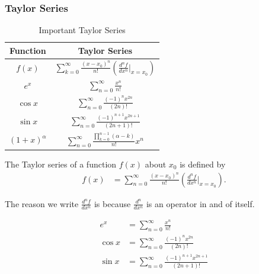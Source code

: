 \documentclass[10pt]{mypackage}
\begin{document}
\subsubsection{Taylor Series}%
\begin{table}
  \centering
  \renewcommand{\arraystretch}{2}
  \begin{tabular}{c|c}
    Function & Taylor Series\\
    \hline\hline
    $f(x)$ & $ \sum_{k=0}^{\infty}\frac{\left(x-x_0\right)^n}{n!}\left(\frac{d^{n}f}{dx^n}\biggr\vert_{x=x_0}\right)$\\
    $e^x$ & $\sum_{n=0}^{\infty}\frac{x^n}{n!}$\\
    $\cos x$ & $\sum_{n=0}^{\infty}\frac{\left(-1\right)^nx^{2n}}{\left(2n\right)!}$\\
    $\sin x$ & $\sum_{n=0}^{\infty}\frac{\left(-1\right)^{n+1}x^{2n+1}}{\left(2n+1\right)!}$\\
    $\left(1 + x\right)^{\alpha}$ & $\sum_{n=0}^{\infty}\frac{\prod_{k=0}^{n-1}\left(\alpha - k\right)}{n!}x^n$
  \end{tabular}
  \caption{Important Taylor Series}
\end{table}
\begin{definition}
  The Taylor series of a function $f(x)$ about $x_0$ is defined by
  \begin{align*}
    f(x) &= \sum_{n=0}^{\infty}\frac{\left(x-x_0\right)^n}{n!}\left(\frac{d^nf}{dx^n}\biggr\vert_{x=x_0}\right).
  \end{align*}
\end{definition}
\begin{remark}
  The reason we write $\frac{d^nf}{dx^n}$ is because $\frac{d^n}{dx^n}$ is an operator in and of itself.
\end{remark}
\begin{example}
  \begin{align*}
    e^x &= \sum_{n=0}^{\infty}\frac{x^n}{n!}\\
    \cos x &= \sum_{n=0}^{\infty}\frac{\left(-1\right)^nx^{2n}}{\left(2n\right)!}\\
    \sin x &= \sum_{n=0}^{\infty}\frac{\left(-1\right)^{n+1}x^{2n+1}}{\left(2n+1\right)!}
  \end{align*}
\end{example}
\end{document}
